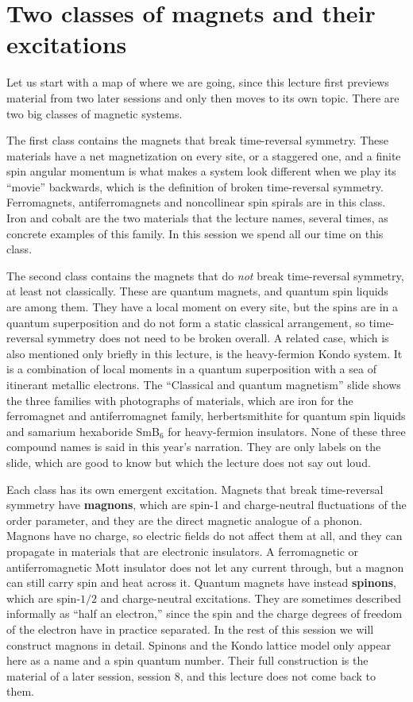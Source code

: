 \section{Two classes of magnets and their excitations}

Let us start with a map of where we are going, since this lecture first previews material from two
later sessions and only then moves to its own topic. There are two big classes of magnetic systems.

The first class contains the magnets that break time-reversal symmetry. These materials have a net
magnetization on every site, or a staggered one, and a finite spin angular momentum is what makes a
system look different when we play its ``movie'' backwards, which is the definition of broken
time-reversal symmetry. Ferromagnets, antiferromagnets and noncollinear spin spirals are in this
class. Iron and cobalt are the two materials that the lecture names, several times, as concrete
examples of this family. In this session we spend all our time on this class.

The second class contains the magnets that do \emph{not} break time-reversal symmetry, at least not
classically. These are quantum magnets, and quantum spin liquids are among them. They have a local
moment on every site, but the spins are in a quantum superposition and do not form a static classical
arrangement, so time-reversal symmetry does not need to be broken overall. A related case, which is
also mentioned only briefly in this lecture, is the heavy-fermion Kondo system. It is a combination of
local moments in a quantum superposition with a sea of itinerant metallic electrons. The ``Classical
and quantum magnetism'' slide shows the three families with photographs of materials, which are iron
for the ferromagnet and antiferromagnet family, herbertsmithite for quantum spin liquids and samarium
hexaboride SmB$_6$ for heavy-fermion insulators. None of these three compound names is said in this
year's narration. They are only labels on the slide, which are good to know but which the lecture does
not say out loud.

Each class has its own emergent excitation. Magnets that break time-reversal symmetry have
\textbf{magnons}, which are spin-1 and charge-neutral fluctuations of the order parameter, and they
are the direct magnetic analogue of a phonon. Magnons have no charge, so electric fields do not affect
them at all, and they can propagate in materials that are electronic insulators. A ferromagnetic or
antiferromagnetic Mott insulator does not let any current through, but a magnon can still carry spin
and heat across it. Quantum magnets have instead \textbf{spinons}, which are spin-$1/2$ and
charge-neutral excitations. They are sometimes described informally as ``half an electron,'' since the
spin and the charge degrees of freedom of the electron have in practice separated. In the rest of this
session we will construct magnons in detail. Spinons and the Kondo lattice model only appear here as a
name and a spin quantum number. Their full construction is the material of a later session, session 8,
and this lecture does not come back to them.

